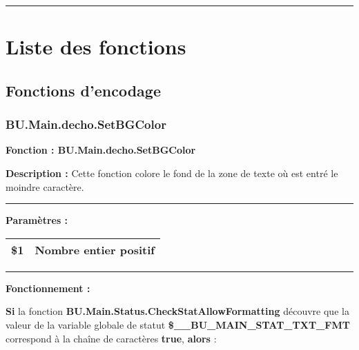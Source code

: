 \documentclass[a4paper,10pt]{article}
\begin{document}


\color{sec1}\par\noindent\rule{\textwidth}{0.4pt}\color{text}

\color{sec1}
\section{Liste des fonctions}\color{text}

\color{sec2}
\subsection{Fonctions d'encodage}\color{text}

\color{sec3}
\subsubsection{BU.Main.decho.SetBGColor}\color{text}

\begin{justify}
    \textbf{Fonction : \color{func}BU.Main.decho.SetBGColor}
\end{justify}

\setlength{\parskip}{1em}

\begin{justify}
    \textbf{Description :} Cette fonction colore le fond de la zone de texte où est entré le moindre caractère.
\end{justify}


\par\noindent\rule{\textwidth}{0.4pt}

\begin{justify}
    \textbf{Paramètres :}

    \begin{tabular}{|l|l|}
        \hline
        \textbf{\color{orange}\$1} & Nombre entier positif\\
        \hline
    \end{tabular}
\end{justify}


\par\noindent\rule{\textwidth}{0.4pt}

\begin{justify}
    \textbf{Fonctionnement :}

    \textbf{\color{cond}Si} la fonction \textbf{\color{func}BU.Main.Status.CheckStatAllowFormatting} découvre que la valeur de la variable globale de statut \textbf{\color{vars}\$\_\_BU\_MAIN\_STAT\_TXT\_FMT} correspond à la chaîne de caractères \textbf{true}, \textbf{\color{cond}alors} :
\end{justify}
\end{document}
